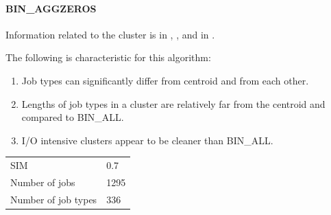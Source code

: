 \documentclass[]{llncs}
\begin{document}
\paragraph{BIN\_AGGZEROS}
Information related to the cluster is in , , and in .

The following is characteristic for this algorithm:

\begin{enumerate}
 \item Job types can significantly differ from centroid and from each other.
 \item Lengths of job types in a cluster are relatively far from the centroid and compared to BIN\_ALL.
 \item I/O intensive clusters appear to be cleaner than BIN\_ALL.
\end{enumerate}

\begingroup
  \begin{tabular}{ll}
    \centering
    SIM &  0.7 \\
    Number of jobs & 1295 \\
    Number of job types & 336 \\
  \end{tabular}
  \label{tab:bin_aggzeros:stats}
\endgroup
\end{document}
